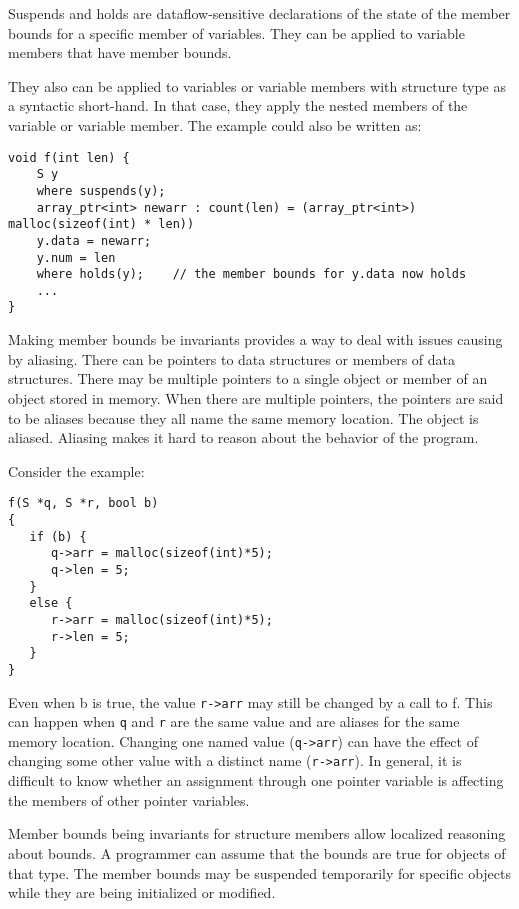 Suspends and holds are dataflow-sensitive declarations of the state of
the member bounds for a specific member of variables. They can be
applied to variable members that have member bounds.

They also can be applied to variables or variable members with structure
type as a syntactic short-hand. In that case, they apply the nested
members of the variable or variable member. The example could also be
written as:

\begin{verbatim}
void f(int len) {
    S y 
    where suspends(y);
    array_ptr<int> newarr : count(len) = (array_ptr<int>) malloc(sizeof(int) * len))
    y.data = newarr;
    y.num = len
    where holds(y);    // the member bounds for y.data now holds
    ...
}
\end{verbatim}

Making member bounds be invariants provides a way to deal with issues
causing by aliasing. There can be pointers to data structures or members
of data structures. There may be multiple pointers to a single object or
member of an object stored in memory. When there are multiple pointers,
the pointers are said to be aliases because they all name the same
memory location. The object is aliased. Aliasing makes it hard to reason
about the behavior of the program.

Consider the example:
\begin{verbatim}
f(S *q, S *r, bool b)
{
   if (b) {
      q->arr = malloc(sizeof(int)*5);
      q->len = 5;
   }
   else {
      r->arr = malloc(sizeof(int)*5);
      r->len = 5;
   }
}
\end{verbatim}

Even when b is true, the value \texttt{r-\textgreater{}arr} may still be
changed by a call to f. This can happen when \texttt{q} and \texttt{r}
are the same value and are aliases for the same memory location.
Changing one named value (\texttt{q-\textgreater{}arr}) can have the
effect of changing some other value with a distinct name
(\texttt{r-\textgreater{}arr}). In general, it is difficult to know
whether an assignment through one pointer variable is affecting the
members of other pointer variables.

Member bounds being invariants for structure members allow localized
reasoning about bounds. A programmer can assume that the bounds are true
for objects of that type. The member bounds may be suspended temporarily
for specific objects while they are being initialized or modified.


